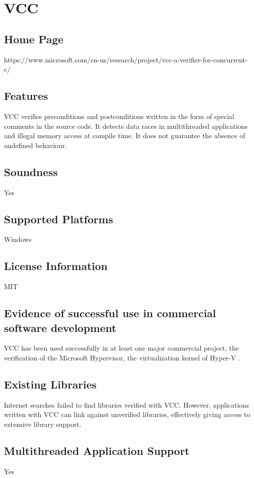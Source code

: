 \documentclass[12pt,openany,a4paper]{book}
\begin{document}
\section{VCC}
	\subsection{Home Page}%
		https://www.microsoft.com/en-us/research/project/vcc-a-verifier-for-concurrent-c/	
	\subsection{Features}
	VCC verifies preconditions and postconditions written in the form of special comments in the source code. 		It detects data races in multithreaded applications and illegal memory access at compile time. It does not 		guarantee the absence of undefined behaviour.

	\subsection{Soundness}
	Yes

	\subsection{Supported Platforms}
	Windows

	\subsection{License Information}
	MIT \cite{vcc01}

	\subsection{Evidence of successful use in commercial software development}
		VCC has been used successfully in at least one major commercial project, the verification of the Microsoft Hypervisor, the virtualization kernel of Hyper-V \cite{vcc2}.

	\subsection{Existing Libraries}
		Internet searches failed to find libraries verified with VCC. However, applications written with VCC can link against unverified libraries, effectively giving access to extensive library support.

	\subsection{Multithreaded Application Support}
	Yes
\end{document}
